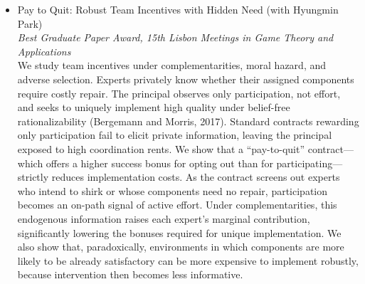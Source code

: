\documentclass[11pt]{article}
\newlength{\oneli}
\begin{document}
\newpage

\begin{itemize}[leftmargin=0em, nosep, itemsep=4pt]
\item  {Pay to Quit: Robust Team Incentives with Hidden Need} (with Hyungmin Park)\\
\textit{Best Graduate Paper Award, 15th Lisbon Meetings in Game Theory and Applications}\\[\oneli]
We study team incentives under complementarities, moral hazard, and adverse selection. Experts privately know whether their assigned components require costly repair. The principal observes only participation, not effort, and seeks to uniquely implement high quality under belief-free rationalizability (Bergemann and Morris, 2017). Standard contracts rewarding only participation fail to elicit private information, leaving the principal exposed to high coordination rents. We show that a ``pay-to-quit'' contract---which offers a higher success bonus for opting out than for participating---strictly reduces implementation costs. 
As the contract screens out experts who intend to shirk or whose components need no repair, participation becomes an on-path signal of active effort. Under complementarities, this endogenous information raises each expert’s marginal contribution, significantly lowering the bonuses required for unique implementation. We also show that, paradoxically, environments in which components are more likely to be already satisfactory can be more expensive to implement robustly, because intervention then becomes less informative.
\end{itemize}
\end{document}
